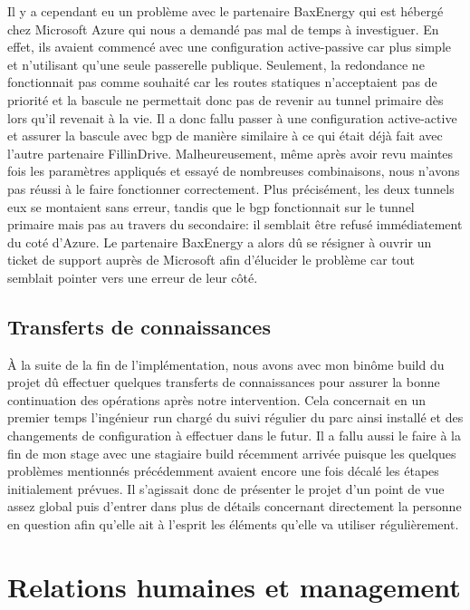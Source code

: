 \documentclass[12pt, oneside, a4paper, titlepage]{report}
\begin{document}
Il y a cependant eu un problème avec le partenaire BaxEnergy qui est hébergé
chez Microsoft Azure qui nous a demandé pas mal de temps à investiguer. En
effet, ils avaient commencé avec une configuration active-passive car plus
simple et n'utilisant qu'une seule passerelle publique.  Seulement, la
redondance ne fonctionnait pas comme souhaité car les routes statiques
n'acceptaient pas de priorité et la bascule ne permettait donc pas de revenir au
tunnel primaire dès lors qu'il revenait à la vie. Il a donc fallu passer à une
configuration active-active et assurer la bascule avec \gls{bgp} de manière
similaire à ce qui était déjà fait avec l'autre partenaire FillinDrive.
Malheureusement, même après avoir revu maintes fois les paramètres appliqués et
essayé de nombreuses combinaisons, nous n'avons pas réussi à le faire
fonctionner correctement. Plus précisément, les deux tunnels eux se montaient
sans erreur, tandis que le \gls{bgp} fonctionnait sur le tunnel primaire mais
pas au travers du secondaire: il semblait être refusé immédiatement du coté
d'Azure. Le partenaire BaxEnergy a alors dû se résigner à ouvrir un ticket de
support auprès de Microsoft afin d'élucider le problème car tout semblait
pointer vers une erreur de leur côté.

\FloatBarrier{}
\subsection{Transferts de connaissances}%
\label{sub:mission::main::trans}

À la suite de la fin de l'implémentation, nous avons avec mon binôme \gls{build}
du projet dû effectuer quelques transferts de connaissances pour assurer la
bonne continuation des opérations après notre intervention. Cela concernait en
un premier temps l'ingénieur \gls{run} chargé du suivi régulier du parc ainsi
installé et des changements de configuration à effectuer dans le futur. Il a
fallu aussi le faire à la fin de mon stage avec une stagiaire \gls{build}
récemment arrivée puisque les quelques problèmes mentionnés précédemment avaient
encore une fois décalé les étapes initialement prévues. Il s'agissait donc de
présenter le projet d'un point de vue assez global puis d'entrer dans plus de
détails concernant directement la personne en question afin qu'elle ait à
l'esprit les éléments qu'elle va utiliser régulièrement.


\section{Relations humaines et management}%
\label{sec:mission::rhm}
\end{document}
